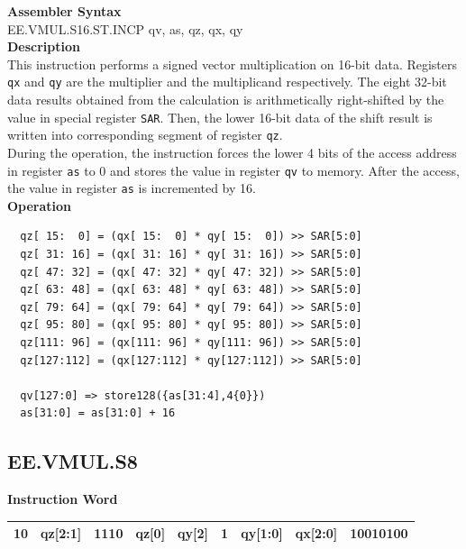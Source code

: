 \textbf{Assembler Syntax} \\
EE.VMUL.S16.ST.INCP qv, as, qz, qx, qy \\
\textbf{Description} \\
This instruction performs a signed vector multiplication on 16-bit data. Registers \lstinline{qx} and \lstinline{qy} are the multiplier and the multiplicand respectively. The eight 32-bit data results obtained from the calculation is arithmetically right-shifted by the value in special register \lstinline{SAR}. Then, the lower 16-bit data of the shift result is written into corresponding segment of register \lstinline{qz}. \\ During the operation, the instruction forces the lower 4 bits of the access address in register \lstinline{as} to 0 and stores the value in register \lstinline{qv} to memory. After the access, the value in register \lstinline{as} is incremented by 16.\\
\textbf{Operation}
\begin{lstlisting}
  qz[ 15:  0] = (qx[ 15:  0] * qy[ 15:  0]) >> SAR[5:0]
  qz[ 31: 16] = (qx[ 31: 16] * qy[ 31: 16]) >> SAR[5:0]
  qz[ 47: 32] = (qx[ 47: 32] * qy[ 47: 32]) >> SAR[5:0]
  qz[ 63: 48] = (qx[ 63: 48] * qy[ 63: 48]) >> SAR[5:0]
  qz[ 79: 64] = (qx[ 79: 64] * qy[ 79: 64]) >> SAR[5:0]
  qz[ 95: 80] = (qx[ 95: 80] * qy[ 95: 80]) >> SAR[5:0]
  qz[111: 96] = (qx[111: 96] * qy[111: 96]) >> SAR[5:0]
  qz[127:112] = (qx[127:112] * qy[127:112]) >> SAR[5:0]

  qv[127:0] => store128({as[31:4],4{0}})
  as[31:0] = as[31:0] + 16
\end{lstlisting}

\clearpage
\subsection{EE.VMUL.S8}\label{instruction:EEVMULS8}
\setlength\tabcolsep{6pt}
\textbf{Instruction Word} \\
\begin{tabular}{|c|c|c|c|c|c|c|c|c|}
	\hline
	10 & qz[2:1] & 1110 & qz[0] & qy[2] & 1 & qy[1:0] & qx[2:0] & 10010100 \\
	\hline
\end{tabular}

